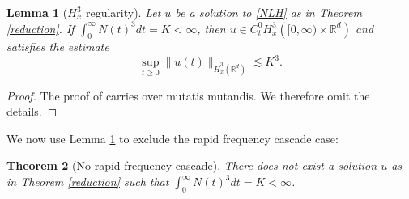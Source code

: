\documentclass[reqno,11pt]{amsart}
\theoremstyle{plain}
\newtheorem{theorem}{Theorem}
\newtheorem{lemma}[theorem]{Lemma}
\theoremstyle{definition}
\numberwithin{equation}{section}
\numberwithin{theorem}{section}
\def\geq{\geqslant}
\def\R{\mathbb{R}}
\begin{document}
\begin{lemma}[$H_{x}^{3}$ regularity]\label{addregu}
 Let $u$ be a solution to \eqref{NLH} as in Theorem \ref{reduction}. If $\int_{0}^{\infty} N(t)^{3}dt=K<\infty$, then $u \in C_{t}^{0} H_{x}^{3}\left([0, \infty) \times \R^d\right)$ and satisfies the estimate
\begin{equation*}
\sup _{t\geq0}\|u(t)\|_{\dot{H}_{x}^3\left(\R^d\right)} \lesssim K^3. 
\end{equation*}
\end{lemma}
\begin{proof}
The proof of \cite{Dodson-JAMS,Dodson-AJM,Dodson-Duke} carries over mutatis mutandis. We therefore omit the details.
\end{proof}
We now use Lemma \ref{addregu} to exclude the rapid frequency cascade case:
\begin{theorem}[No rapid frequency cascade]\label{rapidcascade}
    There does not exist a solution $u$ as in Theorem \ref{reduction}  such that $\int_{0}^{\infty} N(t)^{3} d t=K<\infty$.
\end{theorem}
 
\end{document}
